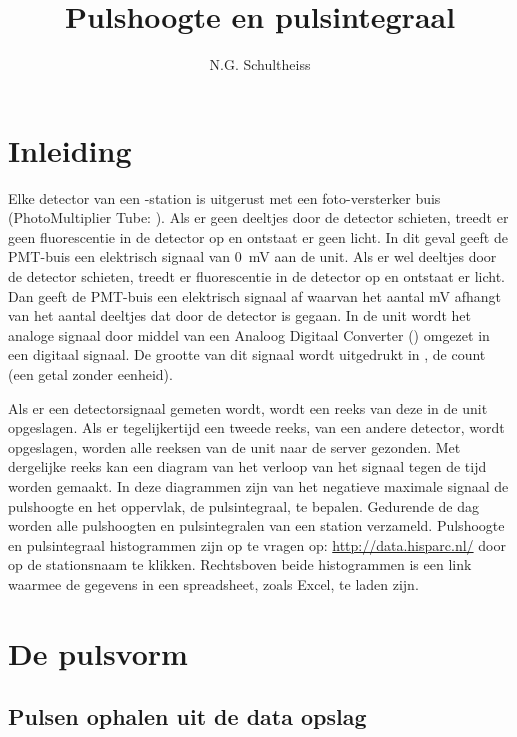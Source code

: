 



\title{Pulshoogte en pulsintegraal}
\author{N.G. Schultheiss}
\date{}

\maketitle

\section{Inleiding}

Elke detector van een \hisparc-station is uitgerust met een
foto-versterker buis (PhotoMultiplier Tube: \pmt). Als er geen deeltjes
door de detector schieten, treedt er geen fluorescentie in de detector
op en ontstaat er geen licht. In dit geval geeft de PMT-buis een
elektrisch signaal van \SI{0}{\milli\volt} aan de \hisparc unit. Als er
wel deeltjes door de detector schieten, treedt er fluorescentie in de
detector op en ontstaat er licht. Dan geeft de PMT-buis een elektrisch
signaal af waarvan het aantal mV afhangt van het aantal deeltjes dat
door de detector is gegaan. In de \hisparc unit wordt het analoge
signaal door middel van een Analoog Digitaal Converter (\adc) omgezet in
een digitaal signaal. De grootte van dit signaal wordt uitgedrukt in
\adcs, de \adc count (een getal zonder eenheid).

Als er een detectorsignaal gemeten wordt, wordt een reeks van deze \adcs
in de \hisparc unit opgeslagen. Als er tegelijkertijd een tweede reeks,
van een andere detector, wordt opgeslagen, worden alle reeksen \adcs van
de \hisparc unit naar de \hisparc server gezonden. Met dergelijke reeks
kan een diagram van het verloop van het signaal tegen de tijd worden
gemaakt. In deze diagrammen zijn van het negatieve maximale signaal de
pulshoogte en het oppervlak, de pulsintegraal, te bepalen. Gedurende de
dag worden alle pulshoogten en pulsintegralen van een station verzameld.
Pulshoogte en pulsintegraal histogrammen zijn op te vragen op:
\url{http://data.hisparc.nl/} door op de stationsnaam te klikken.
Rechtsboven beide histogrammen is een link waarmee de gegevens in een
spreadsheet, zoals Excel, te laden zijn. 


\section{De pulsvorm}


\subsection{Pulsen ophalen uit de \hisparc data opslag}


